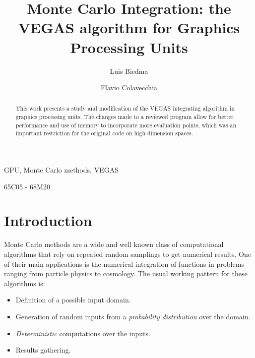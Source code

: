\documentclass[english]{maciarticle}
\begin{document}
\title{Monte Carlo Integration: the VEGAS algorithm for Graphics Processing Units}

\author[$a$]{Luis Biedma}
\author[$b$]{Flavio Colavecchia}
%


 \maketitle


\begin{abstract}
This work presents a study and modification of the VEGAS integrating algorithm in graphics processing units. The changes made to a reviewed program allow for better performance and use of memory to incorporate more evaluation points, which was an important restriction for the original code on high dimension spaces.
\end{abstract}

\begin{keywords}
GPU, Monte Carlo methods, VEGAS
\end{keywords}

\begin{mathsubclass}
65C05 - 68M20
\end{mathsubclass}


{\thispagestyle{empty}} %



\section{Introduction}

Monte Carlo methods are a wide and well known class of computational algorithms that rely on repeated random samplings to get numerical results. One of their main applications is the numerical integration of functions in problems ranging from particle physics\cite{lhc} to cosmology\cite{cosmo}. The usual working pattern for these algorithms is:

\begin{itemize}
	\item Definition of a possible input domain.
	\item Generation of random inputs from a \textit{probability distribution} over the domain.
	\item \textit{Deterministic} computations over the inputs.
	\item Results gathering.
\end{itemize}
\end{document}
